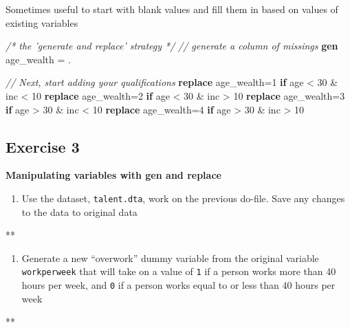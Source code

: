 \documentclass[
]{book}
\newenvironment{Shaded}{\begin{snugshade}}{\end{snugshade}}
\newcommand{\CommentTok}[1]{\textcolor[rgb]{0.56,0.35,0.01}{\textit{#1}}}
\newcommand{\KeywordTok}[1]{\textcolor[rgb]{0.13,0.29,0.53}{\textbf{#1}}}
\newcommand{\NormalTok}[1]{#1}
\providecommand{\tightlist}{%
  \setlength{\itemsep}{0pt}\setlength{\parskip}{0pt}}
\begin{document}
Sometimes useful to start with blank values and fill them in based on values of existing variables

\begin{Shaded}
\begin{Highlighting}[]
  \CommentTok{/* the 'generate and replace' strategy */}
  \CommentTok{// generate a column of missings}
  \KeywordTok{gen}\NormalTok{ age_wealth = .}

  \CommentTok{// Next, start adding your qualifications}
  \KeywordTok{replace}\NormalTok{ age_wealth=1 }\KeywordTok{if}\NormalTok{ age < 30 & inc < 10}
  \KeywordTok{replace}\NormalTok{ age_wealth=2 }\KeywordTok{if}\NormalTok{ age < 30 & inc > 10}
  \KeywordTok{replace}\NormalTok{ age_wealth=3 }\KeywordTok{if}\NormalTok{ age > 30 & inc < 10}
  \KeywordTok{replace}\NormalTok{ age_wealth=4 }\KeywordTok{if}\NormalTok{ age > 30 & inc > 10}
\end{Highlighting}
\end{Shaded}

\hypertarget{exercise-3-4}{%
\subsection{Exercise 3}\label{exercise-3-4}}

\textbf{Manipulating variables with gen and replace}

\begin{enumerate}
\def\labelenumi{\arabic{enumi}.}
\tightlist
\item
  Use the dataset, \texttt{talent.dta}, work on the previous do-file. Save any changes to the data to original data
\end{enumerate}

\begin{Shaded}
\begin{Highlighting}[]
\NormalTok{**}
\end{Highlighting}
\end{Shaded}

\begin{enumerate}
\def\labelenumi{\arabic{enumi}.}
\setcounter{enumi}{1}
\tightlist
\item
  Generate a new ``overwork'' dummy variable from the original variable \texttt{workperweek} that will take on a value of \texttt{1} if a person works more than 40 hours per week, and \texttt{0} if a person works equal to or less than 40 hours per week
\end{enumerate}

\begin{Shaded}
\begin{Highlighting}[]
\NormalTok{**}
\end{Highlighting}
\end{Shaded}
\end{document}
